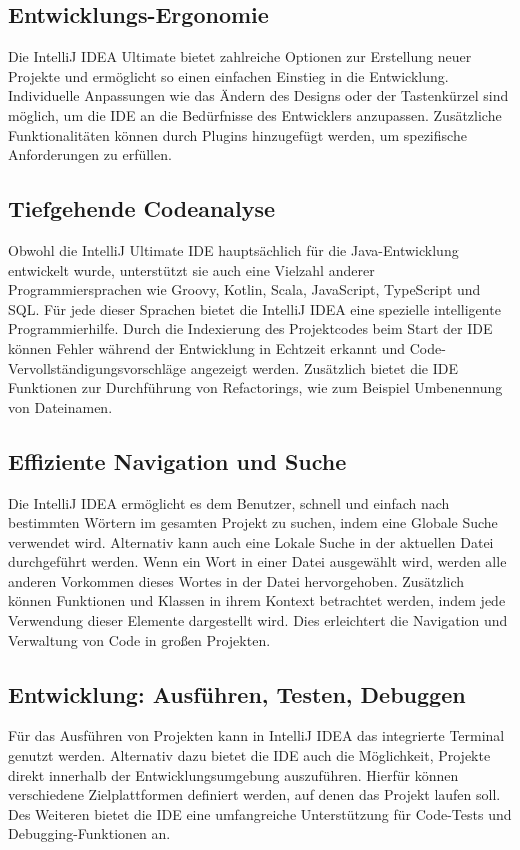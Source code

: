 \subsection{Entwicklungs-Ergonomie}
Die IntelliJ IDEA Ultimate bietet zahlreiche Optionen zur Erstellung neuer Projekte und ermöglicht so einen einfachen Einstieg in die Entwicklung. Individuelle Anpassungen wie das Ändern des Designs oder der Tastenkürzel sind möglich, um die IDE an die Bedürfnisse des Entwicklers anzupassen. Zusätzliche Funktionalitäten können durch Plugins hinzugefügt werden, um spezifische Anforderungen zu erfüllen.
\newpage

\subsection{Tiefgehende Codeanalyse}
Obwohl die IntelliJ Ultimate IDE hauptsächlich für die Java-Entwicklung entwickelt wurde, unterstützt sie auch eine Vielzahl anderer Programmiersprachen wie Groovy, Kotlin, Scala, JavaScript, TypeScript und SQL. Für jede dieser Sprachen bietet die IntelliJ IDEA eine spezielle intelligente Programmierhilfe. Durch die Indexierung des Projektcodes beim Start der IDE können Fehler während der Entwicklung in Echtzeit erkannt und Code-Vervollständigungsvorschläge angezeigt werden. Zusätzlich bietet die IDE Funktionen zur Durchführung von Refactorings, wie zum Beispiel Umbenennung von Dateinamen.

\subsection{Effiziente Navigation und Suche}
Die IntelliJ IDEA ermöglicht es dem Benutzer, schnell und einfach nach bestimmten Wörtern im gesamten Projekt zu suchen, indem eine Globale Suche verwendet wird. Alternativ kann auch eine Lokale Suche in der aktuellen Datei durchgeführt werden. Wenn ein Wort in einer Datei ausgewählt wird, werden alle anderen Vorkommen dieses Wortes in der Datei hervorgehoben. Zusätzlich können Funktionen und Klassen in ihrem Kontext betrachtet werden, indem jede Verwendung dieser Elemente dargestellt wird. Dies erleichtert die Navigation und Verwaltung von Code in großen Projekten.

\subsection{Entwicklung: Ausführen, Testen, Debuggen}
Für das Ausführen von Projekten kann in IntelliJ IDEA das integrierte Terminal genutzt werden. Alternativ dazu bietet die IDE auch die Möglichkeit, Projekte direkt innerhalb der Entwicklungsumgebung auszuführen. Hierfür können verschiedene Zielplattformen definiert werden, auf denen das Projekt laufen soll. Des Weiteren bietet die IDE eine umfangreiche Unterstützung für Code-Tests und Debugging-Funktionen an.
\newpage

